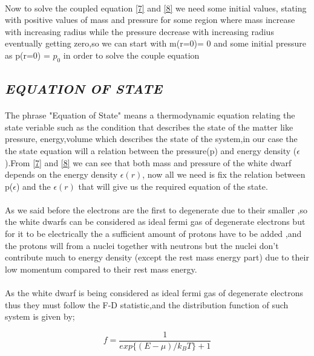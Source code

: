 \documentclass{report}
\begin{document}
\paragraph{ }
Now to solve the coupled equation \ref{7} and \ref{8} we need some initial  values, stating with positive values of mass and pressure for some region where mass increase with increasing radius while the pressure decrease with increasing radius eventually getting zero,so we can start with m(r=0)= 0 and some initial pressure as p(r=0) = $p_0$ in order to solve the couple equation 
\subsection{\textit{EQUATION OF STATE}}
\paragraph{}
The phrase "Equation of State" means a thermodynamic equation relating the state veriable such as the condition that describes the state of the matter like pressure, energy,volume which describes the state of the system,in our case the the state equation will a relation between the pressure(p) and energy density ($\epsilon$).From \ref{7} and \ref{8} we can see that both mass and pressure of the white dwarf depends on the energy density $\epsilon(r)$, now all we need is fix the relation between p($\epsilon$) and the $\epsilon(r)$ that will give us the required equation of the state. 
\paragraph{ }
As we said before the electrons are the first to degenerate due to their smaller ,so the white dwarfs can be considered as ideal fermi gas of degenerate electrons but for it to be electrically the a sufficient amount of protons have to be added ,and the protons will from a nuclei together with neutrons but the nuclei don't contribute much to energy density (except the rest mass energy part) due to their low momentum compared to their rest mass energy.
\newpage
\paragraph{ }
As the white dwarf is being considered as ideal fermi gas of degenerate electrons thus they must follow the F-D statistic,and the distribution function of such system is given by;
\begin{center}
\begin{equation}
f = \frac{1}{exp\{(E-\mu)/k_B T\} +1}
\label{9}
\end{equation}
\end{center} 
\end{document}
